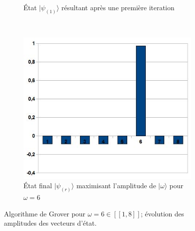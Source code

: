 \begin{figure}[ht!]
\begin{subfigure}[b]{0.40\textwidth}
            \caption{\footnotesize État $|\psi_{(1)}\rangle$ résultant après une première iteration}
            \label{fig2:fourth}
        \end{subfigure}
        \\
        \begin{subfigure}[b]{0.40\textwidth}
            \includegraphics[width=\textwidth]{Grover-EtatFinal.jpg}
            \caption{\footnotesize État final $|\psi_{(r)}\rangle$ maximisant l'amplitude de $|\omega\rangle$ pour $\omega=6$}
            \label{fig2:fifth}
        \end{subfigure}

    \caption{\small Algorithme de Grover pour $\omega=6 \in [\![1,8]\!]$; évolution des amplitudes des vecteurs d'état.}
    \label{fig2:subfigures}
\end{figure}

